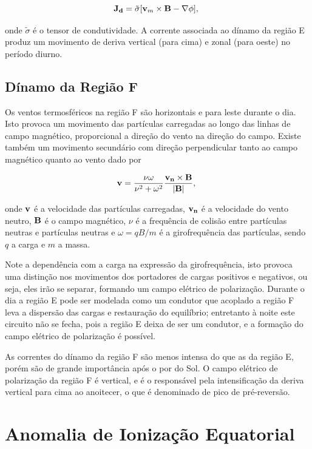 \begin{equation}
{\bf J_d}=\tilde{\sigma}[{\bf v}_m\times{\bf B}-{\bf \nabla}\phi]\mbox{,}~
\end{equation}

onde $\tilde{\sigma}$ é o tensor de condutividade. A corrente associada ao dínamo da região E produz um movimento de deriva vertical (para cima) e zonal (para oeste) no período diurno.

\subsection{Dínamo da Região F}

Os ventos termosféricos na região F são horizontais e para leste durante o dia. Isto provoca um movimento das partículas carregadas ao longo das linhas de campo magnético, proporcional a direção do vento na direção do campo. Existe também um movimento secundário com direção perpendicular tanto ao campo magnético quanto ao vento \cite{BATISTA:1986} dado por

\begin{equation}
{\bf v}=\frac{\nu\omega}{\nu^2+\omega^2}\frac{{\bf v_n}\times{\bf B}}{|{\bf B}|}\mbox{,}~
\end{equation}

onde ${\bf v}$ é a velocidade das partículas carregadas, ${\bf v_n}$ é a velocidade do vento neutro, ${\bf B}$ é o campo magnético, $\nu$ é a frequência de colisão entre partículas neutras e partículas neutras e $\omega={qB/m}$ é a girofrequência das partículas, sendo $q$ a carga e $m$ a massa.

Note a dependência com a carga na expressão da girofrequência, isto provoca uma distinção nos movimentos dos portadores de cargas positivos e negativos, ou seja, eles irão se separar, formando um campo elétrico de polarização. Durante o dia a região E pode ser modelada como um condutor que acoplado a região F leva a dispersão das cargas e restauração do equilíbrio; entretanto à noite este circuito não se fecha, pois a região E deixa de ser um condutor, e a formação do campo elétrico de polarização é possível.

As correntes do dínamo da região F são menos intensa do que as da região E, porém são de grande importância após o por do Sol. O campo elétrico de polarização da região F é vertical, e é o responsável pela intensificação da deriva vertical para cima ao anoitecer, o que é denominado de pico de pré-reversão.

\section{Anomalia de Ionização Equatorial}

